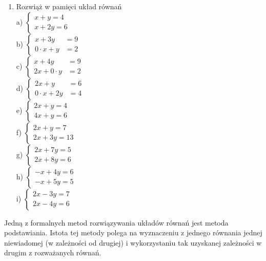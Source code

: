 \documentclass[10pt]{article}
\begin{document}
\begin{enumerate}
  \item Rozwiąż w pamięci układ równań\\
a) \(\left\{\begin{array}{l}x+y=4 \\ x+2 y=6\end{array}\right.\)\\
b) \(\left\{\begin{aligned} x+3 y & =9 \\ 0 \cdot x+y & =2\end{aligned}\right.\)\\
c) \(\left\{\begin{aligned} x+4 y & =9 \\ 2 x+0 \cdot y & =2\end{aligned}\right.\)\\
d) \(\left\{\begin{aligned} 2 x+y & =6 \\ 0 \cdot x+2 y & =4\end{aligned}\right.\)\\
e) \(\left\{\begin{array}{l}2 x+y=4 \\ 4 x+y=6\end{array}\right.\)\\
f) \(\left\{\begin{array}{l}2 x+y=7 \\ 2 x+3 y=13\end{array}\right.\)\\
g) \(\left\{\begin{array}{l}2 x+7 y=5 \\ 2 x+8 y=6\end{array}\right.\)\\
h) \(\left\{\begin{array}{l}-x+4 y=6 \\ -x+5 y=5\end{array}\right.\)\\
i) \(\left\{\begin{array}{l}2 x-3 y=7 \\ 2 x-4 y=6\end{array}\right.\)
\end{enumerate}

Jedną z formalnych metod rozwiązywania układów równań jest metoda podstawiania. Istota tej metody polega na wyznaczeniu z jednego równania jednej niewiadomej (w zależności od drugiej) i wykorzystaniu tak uzyskanej zależności w drugim z rozważanych równań.
\end{document}
